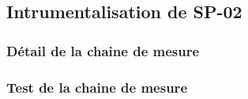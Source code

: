 \subsection{Intrumentalisation de SP-02}

\subsubsection{Détail de la chaine de mesure}

\subsubsection{Test de la chaine de mesure}
